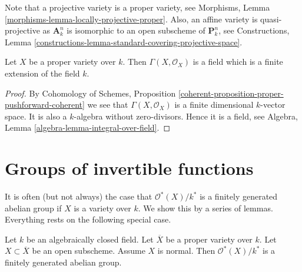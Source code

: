 \noindent
Note that a projective variety is a proper variety, see
Morphisms, Lemma \ref{morphisms-lemma-locally-projective-proper}.
Also, an affine variety is quasi-projective as $\mathbf{A}^n_k$
is isomorphic to an open subscheme of $\mathbf{P}^n_k$, see
Constructions,
Lemma \ref{constructions-lemma-standard-covering-projective-space}.

\begin{lemma}
\label{lemma-regular-functions-proper-variety}
Let $X$ be a proper variety over $k$.
Then $\Gamma(X, \mathcal{O}_X)$ is a field which is
a finite extension of the field $k$.
\end{lemma}

\begin{proof}
By Cohomology of Schemes, Proposition
\ref{coherent-proposition-proper-pushforward-coherent}
we see that $\Gamma(X, \mathcal{O}_X)$ is a finite dimensional
$k$-vector space. It is also a $k$-algebra without zero-divisors.
Hence it is a field, see
Algebra, Lemma \ref{algebra-lemma-integral-over-field}.
\end{proof}




\section{Groups of invertible functions}
\label{section-units}

\noindent
It is often (but not always) the case that $\mathcal{O}^*(X)/k^*$
is a finitely generated abelian group if $X$ is a variety over $k$.
We show this by a series of lemmas.
Everything rests on the following special case.

\begin{lemma}
\label{lemma-open-in-normal-proper}
Let $k$ be an algebraically closed field.
Let $\overline{X}$ be a proper variety over $k$.
Let $X \subset \overline{X}$ be an open subscheme.
Assume $X$ is normal.
Then $\mathcal{O}^*(X)/k^*$ is a finitely generated abelian group.
\end{lemma}

